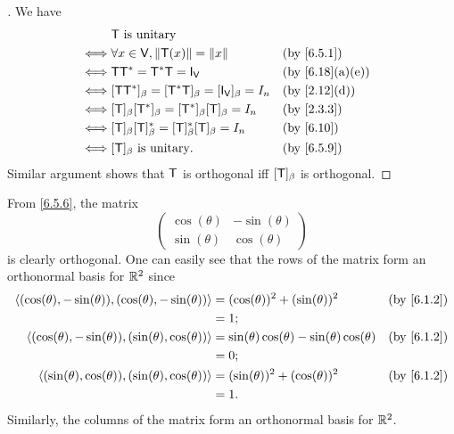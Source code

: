 \begin{proof}[]
  We have
  \begin{align*}
         & \T \text{ is unitary}                                                               \\
    \iff & \forall x \in \V, \norm{\T(x)} = \norm{x}                       &  & \by{6.5.1}     \\
    \iff & \T \T^* = \T^* \T = \IT[\V]                                     &  & \by{6.18}[a,e] \\
    \iff & [\T \T^*]_{\beta} = [\T^* \T]_{\beta} = [\IT[\V]]_{\beta} = I_n &  & \by{2.12}[d]   \\
    \iff & [\T]_{\beta} [\T^*]_{\beta} = [\T^*]_{\beta} [\T]_{\beta} = I_n &  & \by{2.3.3}     \\
    \iff & [\T]_{\beta} [\T]_{\beta}^* = [\T]_{\beta}^* [\T]_{\beta} = I_n &  & \by{6.10}      \\
    \iff & [\T]_{\beta} \text{ is unitary}.                                &  & \by{6.5.9}
  \end{align*}
  Similar argument shows that \(\mathsf{T}\) is orthogonal iff \([\mathsf{T}]_{\beta}\) is orthogonal.
\end{proof}

\begin{eg}\label{6.5.11}
  From \cref{6.5.6}, the matrix
  \[
    \begin{pmatrix}
      \cos(\theta) & -\sin(\theta) \\
      \sin(\theta) & \cos(\theta)
    \end{pmatrix}
  \]
  is clearly orthogonal.
  One can easily see that the rows of the matrix form an orthonormal basis for \(\mathbb{R}^2\) since
  \begin{align*}
    \inn{(\cos(\theta), -\sin(\theta)), (\cos(\theta), -\sin(\theta))} & = (\cos(\theta))^2 + (\sin(\theta))^2                   &  & \by{6.1.2} \\
                                                                       & = 1;                                                                    \\
    \inn{(\cos(\theta), -\sin(\theta)), (\sin(\theta), \cos(\theta))}  & = \sin(\theta) \cos(\theta) - \sin(\theta) \cos(\theta) &  & \by{6.1.2} \\
                                                                       & = 0;                                                                    \\
    \inn{(\sin(\theta), \cos(\theta)), (\sin(\theta), \cos(\theta))}   & = (\sin(\theta))^2 + (\cos(\theta))^2                   &  & \by{6.1.2} \\
                                                                       & = 1.
  \end{align*}
  Similarly, the columns of the matrix form an orthonormal basis for \(\mathbb{R}^2\).
\end{eg}

